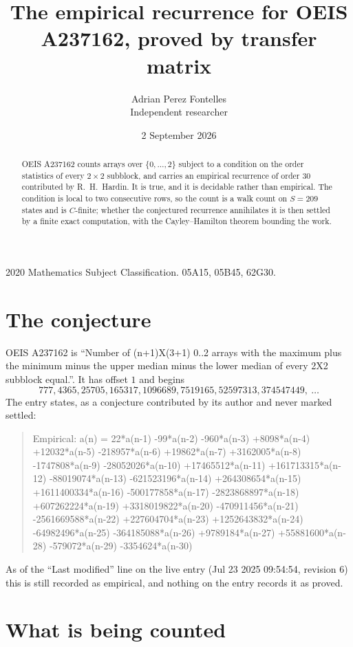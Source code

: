 \documentclass[11pt,a4paper]{article}
\title{The empirical recurrence for OEIS A237162, proved by transfer matrix}
\author{Adrian Perez Fontelles\\ \small Independent researcher}
\date{2 September 2026}
\theoremstyle{plain}
\theoremstyle{definition}
\begin{document}
\maketitle

\begin{abstract}
OEIS A237162 counts arrays over $\{0,\dots,2\}$ subject to a condition on the order
statistics of every $2\times2$ subblock, and carries an empirical recurrence of order
$30$ contributed by R.~H.~Hardin. It is true, and it is decidable rather than empirical.
The condition is local to two consecutive rows, so the count is a walk count on $S=209$
states and is $C$-finite; whether the conjectured recurrence annihilates it is then settled by
a finite exact computation, with the Cayley--Hamilton theorem bounding the work.
\end{abstract}

\noindent\small 2020 Mathematics Subject Classification. 05A15, 05B45, 62G30.\normalsize

\section{The conjecture}

OEIS A237162 is ``Number of (n+1)X(3+1) 0..2 arrays with the maximum plus the minimum minus the upper median minus the lower median of every 2X2 subblock equal.''. It has offset $1$ and begins
\[
777, 4365, 25705, 165317, 1096689, 7519165, 52597313, 374547449,\ \dots
\]
The entry states, as a conjecture contributed by its author and never marked settled:
\begin{quote}
Empirical: a(n) = 22*a(n-1) -99*a(n-2) -960*a(n-3) +8098*a(n-4) +12032*a(n-5) -218957*a(n-6) +19862*a(n-7) +3162005*a(n-8) -1747808*a(n-9) -28052026*a(n-10) +17465512*a(n-11) +161713315*a(n-12) -88019074*a(n-13) -621523196*a(n-14) +264308654*a(n-15) +1611400334*a(n-16) -500177858*a(n-17) -2823868897*a(n-18) +607262224*a(n-19) +3318019822*a(n-20) -470911456*a(n-21) -2561669588*a(n-22) +227604704*a(n-23) +1252643832*a(n-24) -64982496*a(n-25) -364185088*a(n-26) +9789184*a(n-27) +55881600*a(n-28) -579072*a(n-29) -3354624*a(n-30)
\end{quote}
As of the ``Last modified'' line on the live entry (Jul 23 2025 09:54:54, revision 6) this is still
recorded as empirical, and nothing on the entry records it as proved.

\section{What is being counted}
\end{document}
